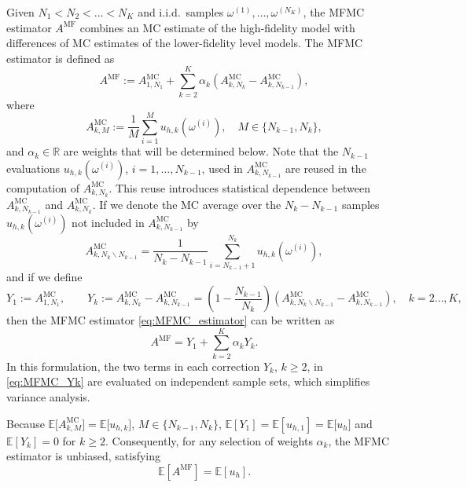 Given $N_1 < N_2 < \ldots < N_K$ and i.i.d.\ samples $\omega^{(1)}, \ldots, \omega^{(N_K)}$,
the MFMC estimator $A^{\text{MF}}$ combines an MC estimate of the high-fidelity model with differences 
of MC estimates of the lower-fidelity level models.
The MFMC estimator is defined as
\begin{equation}\label{eq:MFMC_estimator}
    A^{\text{MF}}
     := A^{\text{MC}}_{1,N_1} + \sum_{k=2}^K \alpha_k\left(A^{\text{MC}}_{k,N_k} - A^{\text{MC}}_{k,N_{k-1}} \right),
\end{equation}
where
\begin{equation}\label{eq:MFMC_estimator_MCk}
     A^{\text{MC}}_{k,M} :=  \frac{1}{M} \sum_{i=1}^{M}   u_{h,k}(\omega^{(i)}), \quad M \in \{ N_{k-1}, N_k \},
\end{equation}
and $\alpha_k\in \mathbb{R}$ are weights that will be determined below.
Note that the $N_{k-1}$ evaluations $u_{h,k}(\omega^{(i)})$, $i = 1, \ldots,  N_{k-1}$,
used in  $A^{\text{MC}}_{k,N_{k-1}}$ are reused in  the computation of $A^{\text{MC}}_{k,N_k}$.
This reuse introduces statistical dependence between 
$A^{\text{MC}}_{k,N_{k-1}}$ and $A^{\text{MC}}_{k,N_k}$. 
If we denote the MC average over the $N_k - N_{k-1}$ samples $u_{h,k}(\omega^{(i)})$ 
not included in $A^{\text{MC}}_{k,N_{k-1}}$ by
\[
     A^{\text{MC}}_{k,N_k \backslash N_{k-1}}
      =  \frac{1}{N_k-N_{k-1}}  \sum_{i=N_{k-1}+1}^{N_k}   u_{h,k}(\omega^{(i)}), 
\]
and if we define 
\begin{equation} \label{eq:MFMC_Yk}
       Y_1 := A^{\text{MC}}_{1,N_1},\qquad 
       Y_k := A^{\text{MC}}_{k,N_k} - A^{\text{MC}}_{k,N_{k-1}}
               =\left(1-\frac{N_{k-1}}{N_k}\right)
                 \left(A_{k,N_k\backslash N_{k-1}}^{\text{MC}}-A_{k,N_{k-1}}^{\text{MC}}\right), \quad k=2\ldots, K,
\end{equation}
then the MFMC estimator \eqref{eq:MFMC_estimator} can be written as
\begin{equation}\label{eq:MFMC_estimator_independent}
       A^{\text{MF}} = Y_1 + \sum_{k=2}^K \alpha_k Y_k.
\end{equation}
In this formulation, the two terms in each correction $Y_k$, $k \ge 2$, in \eqref{eq:MFMC_Yk}
are evaluated on independent sample sets, which simplifies variance analysis. 

Because $\mathbb{E}\big[ A^{\text{MC}}_{k,M} \big] = \mathbb{E}\big[ u_{h,k} \big]$, $M \in \{ N_{k-1}, N_k \}$,
$\mathbb{E}[Y_1] =  \mathbb{E}[u_{h,1}]  = \mathbb{E}\big[ u_h \big]$ and  $\mathbb{E}[Y_k] = 0$ for $k\ge 2$.
Consequently, for any selection of weights $\alpha_k$, 
the MFMC estimator is  unbiased, satisfying 
\begin{equation}\label{eq:AMF-unbiased}
        \mathbb{E}[A^{\text{MF}}] =  \mathbb{E}[u_h].
\end{equation}


